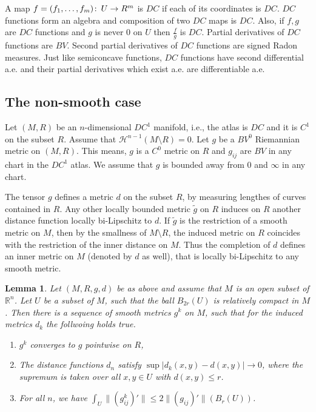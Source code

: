 \documentclass[12pt,leqno,intlimits]{amsart}
\numberwithin{equation}{section}
\newtheorem{lem}[thm]{Lemma}
\theoremstyle{definition}
\theoremstyle{remark}
\newcommand{\R}{\mathbb{R}}
\def\co{\colon\thinspace}
\begin{document}
A map $f=(f_1,\ldots, f_m)\co U\to R^m$ is $DC$ if each of its coordinates is $DC$.
 $DC$ functions form an algebra and composition of two $DC$ maps is $DC$. Also, if $f,g$ are $DC$ functions and $g$ is never $0$ on $U$ then $\frac f g$ is $DC$.
Partial derivatives of $DC$ functions are $BV$. Second partial derivatives of $DC$ functions are signed Radon measures. Just like semiconcave functions, $DC$ functions have second differential  a.e. and their partial derivatives which exist a.e. are differentiable a.e.



\subsection{The non-smooth case}
Let $(M,R)$ be an $n$-dimensional  $DC^1$ manifold, i.e., the atlas is $DC$ and it is
$C^1$ on the subset $R$.  Assume that $\mathcal H^{n-1} (M\setminus R) =0$.  Let $g$ be a $BV^0$
Riemannian metric on $(M,R)$. This means, $g$ is a $C^0$ metric on $R$ and $g_{ij}$ are $BV$ in any chart in the $DC^1$ atlas.  We assume that $g$ is bounded  away from $0$ and $\infty$ in any chart.

 The tensor $g$ defines a metric $d$ on the subset $R$, by measuring lengthes of curves contained in $R$.
Any other locally bounded metric $\tilde g$ on $R$ induces on $R$ another distance function locally bi-Lipschitz to $d$.
  If $\tilde g$ is the restriction of a smooth metric on $M$, then by the smallness of $M\setminus R$,
  the induced metric on $R$ coincides with the restriction of the inner distance on $M$.
   Thus  the completion of $d$   defines an inner  metric on $M$
  (denoted by $d$ as well), that is locally bi-Lipschitz to any smooth metric.



 \begin{lem}
 Let $(M,R,g,d)$ be as above and assume that $M$ is an open subset of $\R^n$. Let $U$ be a subset
 of $M$, such that the ball $B_{2r} (U)$ is relatively compact in $M$. Then
 there is a sequence of smooth metrics $g^k$ on $M$, such that for the induced metrics $d_k$ the follwoing holds true.

 \begin{enumerate}
 \item $g^k$ converges to $g$ pointwise on $R$,
 \item  The distance functions $d_n$ satisfy $\sup |d_k (x,y)- d(x,y)| \to 0$, where the supremum is taken
 over all $x,y \in U$ with $ d(x,y) \leq r$.
 \item For all $n$, we have $\int _U  \|(g^k_{ij} )'\| \leq 2\|(g _{ij})'\|(  B_r (U))$.
 \end{enumerate}
\end{lem}
\end{document}
